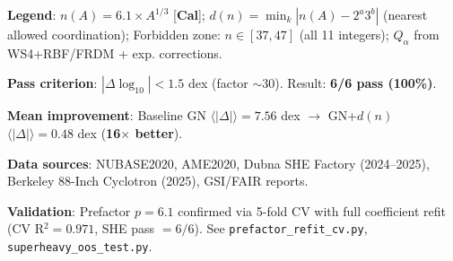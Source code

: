\begin{table}[htbp]
\vspace{3mm}
\footnotesize
\textbf{Legend}:
$n(A) = 6.1 \times A^{1/3}$ [\textbf{Cal}];
$d(n) = \min_k |n(A) - 2^a 3^b|$ (nearest allowed coordination);
Forbidden zone: $n \in [37, 47]$ (all 11 integers);
$Q_\alpha$ from WS4+RBF/FRDM + exp. corrections.

\vspace{1mm}
\textbf{Pass criterion}: $|\Delta\log_{10}| < 1.5$ dex (factor $\sim$30).
Result: \textbf{6/6 pass (100\%)}.

\vspace{1mm}
\textbf{Mean improvement}: Baseline GN $\langle|\Delta|\rangle = 7.56$ dex $\to$
GN+$d(n)$ $\langle|\Delta|\rangle = 0.48$ dex (\textbf{16$\times$ better}).

\vspace{1mm}
\textbf{Data sources}: NUBASE2020, AME2020, Dubna SHE Factory (2024--2025),
Berkeley 88-Inch Cyclotron (2025), GSI/FAIR reports.

\vspace{1mm}
\textbf{Validation}: Prefactor $p = 6.1$ confirmed via 5-fold CV with full
coefficient refit (CV R$^2 = 0.971$, SHE pass $= 6/6$).
See \texttt{prefactor\_refit\_cv.py}, \texttt{superheavy\_oos\_test.py}.
\end{table}
